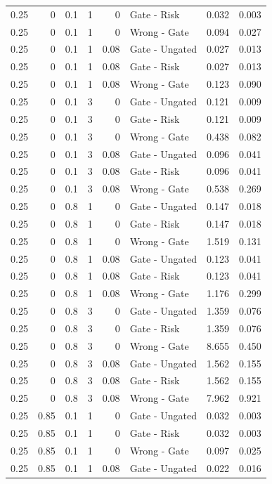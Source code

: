 \begin{longtable}{rrrrrlrr}
0.25 & 0 & 0.1 & 1 & 0 & Gate - Risk & 0.032 & 0.003\\
0.25 & 0 & 0.1 & 1 & 0 & Wrong - Gate & 0.094 & 0.027\\
0.25 & 0 & 0.1 & 1 & 0.08 & Gate - Ungated & 0.027 & 0.013\\
0.25 & 0 & 0.1 & 1 & 0.08 & Gate - Risk & 0.027 & 0.013\\
0.25 & 0 & 0.1 & 1 & 0.08 & Wrong - Gate & 0.123 & 0.090\\
0.25 & 0 & 0.1 & 3 & 0 & Gate - Ungated & 0.121 & 0.009\\
0.25 & 0 & 0.1 & 3 & 0 & Gate - Risk & 0.121 & 0.009\\
0.25 & 0 & 0.1 & 3 & 0 & Wrong - Gate & 0.438 & 0.082\\
0.25 & 0 & 0.1 & 3 & 0.08 & Gate - Ungated & 0.096 & 0.041\\
0.25 & 0 & 0.1 & 3 & 0.08 & Gate - Risk & 0.096 & 0.041\\
0.25 & 0 & 0.1 & 3 & 0.08 & Wrong - Gate & 0.538 & 0.269\\
0.25 & 0 & 0.8 & 1 & 0 & Gate - Ungated & 0.147 & 0.018\\
0.25 & 0 & 0.8 & 1 & 0 & Gate - Risk & 0.147 & 0.018\\
0.25 & 0 & 0.8 & 1 & 0 & Wrong - Gate & 1.519 & 0.131\\
0.25 & 0 & 0.8 & 1 & 0.08 & Gate - Ungated & 0.123 & 0.041\\
0.25 & 0 & 0.8 & 1 & 0.08 & Gate - Risk & 0.123 & 0.041\\
0.25 & 0 & 0.8 & 1 & 0.08 & Wrong - Gate & 1.176 & 0.299\\
0.25 & 0 & 0.8 & 3 & 0 & Gate - Ungated & 1.359 & 0.076\\
0.25 & 0 & 0.8 & 3 & 0 & Gate - Risk & 1.359 & 0.076\\
0.25 & 0 & 0.8 & 3 & 0 & Wrong - Gate & 8.655 & 0.450\\
0.25 & 0 & 0.8 & 3 & 0.08 & Gate - Ungated & 1.562 & 0.155\\
0.25 & 0 & 0.8 & 3 & 0.08 & Gate - Risk & 1.562 & 0.155\\
0.25 & 0 & 0.8 & 3 & 0.08 & Wrong - Gate & 7.962 & 0.921\\
0.25 & 0.85 & 0.1 & 1 & 0 & Gate - Ungated & 0.032 & 0.003\\
0.25 & 0.85 & 0.1 & 1 & 0 & Gate - Risk & 0.032 & 0.003\\
0.25 & 0.85 & 0.1 & 1 & 0 & Wrong - Gate & 0.097 & 0.025\\
0.25 & 0.85 & 0.1 & 1 & 0.08 & Gate - Ungated & 0.022 & 0.016\\

\end{longtable}
